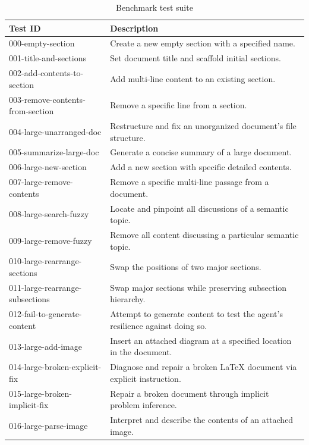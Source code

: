 \begin{table}[htb]
\centering
\begin{tabularx}{\textwidth}{|l|X|}
\hline
\textbf{Test ID} & \textbf{Description} \\
\hline
000-empty-section & Create a new empty section with a specified name. \\
\hline
001-title-and-sections & Set document title and scaffold initial sections. \\
\hline
002-add-contents-to-section & Add multi-line content to an existing section. \\
\hline
003-remove-contents-from-section & Remove a specific line from a section. \\
\hline
004-large-unarranged-doc & Restructure and fix an unorganized document's file structure. \\
\hline
005-summarize-large-doc & Generate a concise summary of a large document. \\
\hline
006-large-new-section & Add a new section with specific detailed contents. \\
\hline
007-large-remove-contents & Remove a specific multi-line passage from a document. \\
\hline
008-large-search-fuzzy & Locate and pinpoint all discussions of a semantic topic. \\
\hline
009-large-remove-fuzzy & Remove all content discussing a particular semantic topic. \\
\hline
010-large-rearrange-sections & Swap the positions of two major sections. \\
\hline
011-large-rearrange-subsections & Swap major sections while preserving subsection hierarchy. \\
\hline
012-fail-to-generate-content & Attempt to generate content to test the agent's resilience against doing so. \\
\hline
013-large-add-image & Insert an attached diagram at a specified location in the document. \\
\hline
014-large-broken-explicit-fix & Diagnose and repair a broken LaTeX document via explicit instruction. \\
\hline
015-large-broken-implicit-fix & Repair a broken document through implicit problem inference. \\
\hline
016-large-parse-image & Interpret and describe the contents of an attached image. \\
\hline
\end{tabularx}
\caption{Benchmark test suite}
\label{tab:tests}
\end{table}

